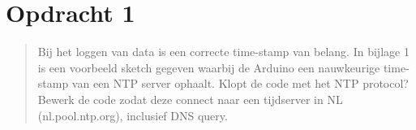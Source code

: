 \documentclass[12pt]{article}
\begin{document}
\clearpage

{}
\section*{Opdracht 1}
\begin{quote}
Bij het loggen van data is een correcte time-stamp van belang. In bijlage 1 is een voorbeeld sketch gegeven waarbij de Arduino een nauwkeurige time-stamp van een NTP server ophaalt. Klopt de code met het NTP protocol? Bewerk de code zodat deze connect naar een tijdserver in NL (nl.pool.ntp.org), inclusief DNS query.
\end{quote}
\end{document}
